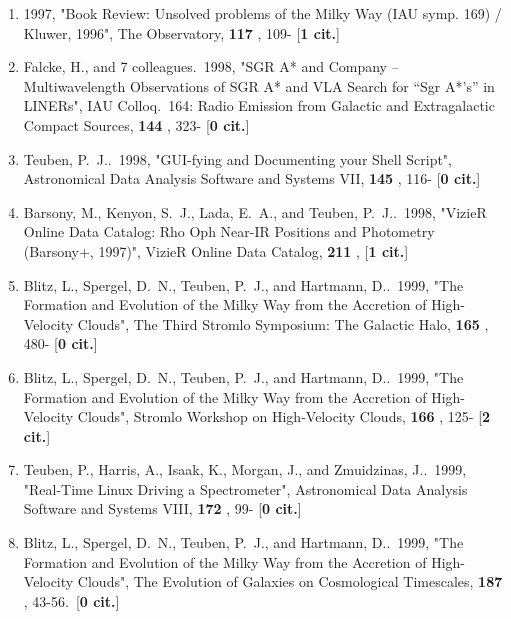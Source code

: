 \documentclass[11pt,letterpaper]{article}
\begin{document}
\begin{enumerate}[resume,label=\textbf{\arabic*}.]
\item  
 1997,  "Book Review: Unsolved problems of the Milky Way (IAU symp. 169) / 
Kluwer, 1996", The Observatory,  {\bf 117} , 109- [{\bf 1 cit.}] 

\item  
Falcke, H., and 7 colleagues.\  1998,  "SGR A* and Company -- 
Multiwavelength Observations of SGR A* and VLA Search for ``Sgr A*'s'' in 
LINERs", IAU Colloq.~164: Radio Emission from Galactic and Extragalactic 
Compact Sources,  {\bf 144} , 323- [{\bf 0 cit.}] 

\item  
Teuben, P.~J..\  1998,  "GUI-fying and Documenting your Shell Script", 
Astronomical Data Analysis Software and Systems VII,  {\bf 145} , 116- 
[{\bf 0 cit.}] 


\item  
Barsony, M., Kenyon, S.~J., Lada, E.~A., and Teuben, P.~J..\  1998,  
"VizieR Online Data Catalog: Rho Oph Near-IR Positions and Photometry 
(Barsony+, 1997)", VizieR Online Data Catalog,  {\bf 211} ,  [{\bf 1 cit.}] 



\item  
Blitz, L., Spergel, D.~N., Teuben, P.~J., and Hartmann, D..\  1999,  "The 
Formation and Evolution of the Milky Way from the Accretion of 
High-Velocity Clouds", The Third Stromlo Symposium: The Galactic Halo,  
{\bf 165} , 480- [{\bf 0 cit.}] 

\item  
Blitz, L., Spergel, D.~N., Teuben, P.~J., and Hartmann, D..\  1999,  "The 
Formation and Evolution of the Milky Way from the Accretion of 
High-Velocity Clouds", Stromlo Workshop on High-Velocity Clouds,  {\bf 166} 
, 125- [{\bf 2 cit.}] 

\item  
Teuben, P., Harris, A., Isaak, K., Morgan, J., and Zmuidzinas, J..\  1999,  
"Real-Time Linux Driving a Spectrometer", Astronomical Data Analysis 
Software and Systems VIII,  {\bf 172} , 99- [{\bf 0 cit.}] 

\item  
Blitz, L., Spergel, D.~N., Teuben, P.~J., and Hartmann, D..\  1999,  "The 
Formation and Evolution of the Milky Way from the Accretion of 
High-Velocity Clouds", The Evolution of Galaxies on Cosmological 
Timescales,  {\bf 187} , 43-56.\  [{\bf 0 cit.}] 


\end{enumerate}
\end{document}
